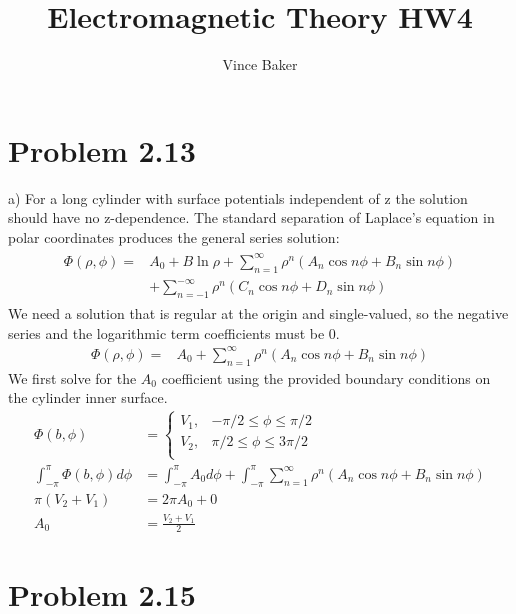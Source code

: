 \documentclass[a4paper,11pt]{article}
\title{Electromagnetic Theory HW4}
\author{Vince Baker}
\numberwithin{equation}{section}
\newcommand{\lrp}[1]{\left({#1}\right)}
\begin{document}
\maketitle

\section{Problem 2.13}
a) For a long cylinder with surface potentials independent of z the solution should have no z-dependence.
The standard separation of Laplace's equation in polar coordinates produces the general series solution:
\begin{align}
 \begin{split}
  \Phi(\rho, \phi) = &A_0 + B\ln{\rho}+\sum_{n=1}^\infty \rho^n\lrp{A_n\cos{n\phi}+B_n\sin{n\phi}}\\
		    &+ \sum_{n=-1}^{-\infty} \rho^n\lrp{C_n\cos{n\phi}+D_n\sin{n\phi}}
 \end{split}
\end{align}
We need a solution that is regular at the origin and single-valued, so the negative series and the logarithmic term coefficients must be 0.
\begin{align}
  \Phi(\rho, \phi) = &A_0 +\sum_{n=1}^\infty \rho^n\lrp{A_n\cos{n\phi}+B_n\sin{n\phi}}
\end{align}
We first solve for the $A_0$ coefficient using the provided boundary conditions on the cylinder inner surface.
\begin{align}
 \Phi(b,\phi) &= \begin{cases}
                 V_1,& -\pi/2\le\phi\le\pi/2 \\
                 V_2,& \pi/2\le\phi\le3\pi/2 \\
                \end{cases}\\
 \int_{-\pi}^\pi \Phi(b,\phi) d\phi &= \int_{-\pi}^\pi A_0 d\phi + \int_{-\pi}^{\pi}\sum_{n=1}^\infty \rho^n\lrp{A_n\cos{n\phi}+B_n\sin{n\phi}}\\
 \pi (V_2+V_1) &= 2\pi A_0 + 0\\
 A_0 &= \frac{V_2+V_1}{2}
\end{align}



\section{Problem 2.15}
\end{document}
